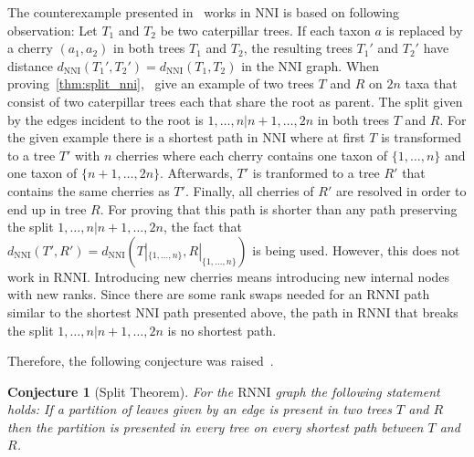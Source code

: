 \documentclass[11pt, a4paper]{article}
\newcommand{\nni}{\mathrm{NNI}}
\newcommand{\rnni}{\mathrm{RNNI}}
\newtheorem{conjecture}[definition]{Conjecture}
\begin{document}
The counterexample presented in~\cite{Li1996} works in $\nni$ is based on following observation:
Let $T_1$ and $T_2$ be two caterpillar trees.
If each taxon $a$ is replaced by a cherry $(a_1,a_2)$ in both trees $T_1$ and $T_2$, the resulting trees $T_1'$ and $T_2'$ have distance $d_{\nni}(T_1',T_2') = d_{\nni}(T_1,T_2)$ in the $\nni$ graph.
When proving~\ref{thm:split_nni},~\cite{Li1996} give an example of two trees $T$ and $R$ on $2n$ taxa that consist of two caterpillar trees each that share the root as parent.
The split given by the edges incident to the root is $1, \ldots, n | n+1, \ldots, 2n$ in both trees $T$ and $R$.
For the given example there is a shortest path in $\nni$ where at first $T$ is transformed to a tree $T'$ with $n$ cherries where each cherry contains one taxon of $\{1, \ldots, n\}$ and one taxon of $\{n+1, \ldots, 2n\}$.
Afterwards, $T'$ is tranformed to a tree $R'$ that contains the same cherries as $T'$.
Finally, all cherries of $R'$ are resolved in order to end up in tree $R$.
For proving that this path is shorter than any path preserving the split $1, \ldots, n | n+1, \ldots, 2n$, the fact that $d_{\nni}(T',R') = d_{\nni}(T|_{\{1, \ldots, n\}}, R|_{\{1, \ldots, n\}})$ is being used.
However, this does not work in $\rnni$.
Introducing new cherries means introducing new internal nodes with new ranks.
Since there are some rank swaps needed for an $\rnni$ path similar to the shortest $\nni$ path presented above, the path in $\rnni$ that breaks the split $1, \ldots, n | n+1, \ldots, 2n$ is no shortest path.


Therefore, the following conjecture was raised~\cite{Gavryushkin2017}.

\begin{conjecture}[Split Theorem]
	For the $\rnni$ graph the following statement holds:
	If a partition of leaves given by an edge is present in two trees $T$ and $R$ then the partition is presented in every tree on every shortest path between $T$ and $R$.
	\label{split_theorem}
\end{conjecture}
\end{document}
